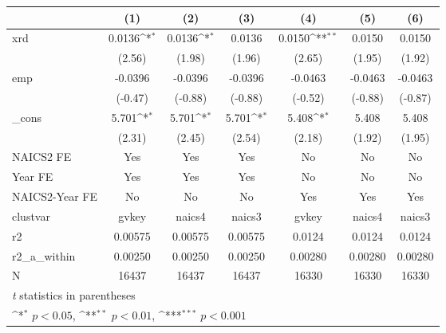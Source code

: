 {
\def\sym#1{\ifmmode^{#1}\else\(^{#1}\)\fi}
\begin{tabular}{l*{6}{c}}
\hline\hline
            &\multicolumn{1}{c}{(1)}         &\multicolumn{1}{c}{(2)}         &\multicolumn{1}{c}{(3)}         &\multicolumn{1}{c}{(4)}         &\multicolumn{1}{c}{(5)}         &\multicolumn{1}{c}{(6)}         \\
\hline
xrd         &      0.0136\sym{*}  &      0.0136\sym{*}  &      0.0136         &      0.0150\sym{**} &      0.0150         &      0.0150         \\
            &      (2.56)         &      (1.98)         &      (1.96)         &      (2.65)         &      (1.95)         &      (1.92)         \\
[1em]
emp         &     -0.0396         &     -0.0396         &     -0.0396         &     -0.0463         &     -0.0463         &     -0.0463         \\
            &     (-0.47)         &     (-0.88)         &     (-0.88)         &     (-0.52)         &     (-0.88)         &     (-0.87)         \\
[1em]
\_cons      &       5.701\sym{*}  &       5.701\sym{*}  &       5.701\sym{*}  &       5.408\sym{*}  &       5.408         &       5.408         \\
            &      (2.31)         &      (2.45)         &      (2.54)         &      (2.18)         &      (1.92)         &      (1.95)         \\
[1em]
NAICS2 FE   &         Yes         &         Yes         &         Yes         &          No         &          No         &          No         \\
[1em]
Year FE     &         Yes         &         Yes         &         Yes         &          No         &          No         &          No         \\
[1em]
NAICS2-Year FE&          No         &          No         &          No         &         Yes         &         Yes         &         Yes         \\
\hline
clustvar    &       gvkey         &      naics4         &      naics3         &       gvkey         &      naics4         &      naics3         \\
r2          &     0.00575         &     0.00575         &     0.00575         &      0.0124         &      0.0124         &      0.0124         \\
r2\_a\_within &     0.00250         &     0.00250         &     0.00250         &     0.00280         &     0.00280         &     0.00280         \\
N           &       16437         &       16437         &       16437         &       16330         &       16330         &       16330         \\
\hline\hline
\multicolumn{7}{l}{\footnotesize \textit{t} statistics in parentheses}\\
\multicolumn{7}{l}{\footnotesize \sym{*} \(p<0.05\), \sym{**} \(p<0.01\), \sym{***} \(p<0.001\)}\\
\end{tabular}
}
